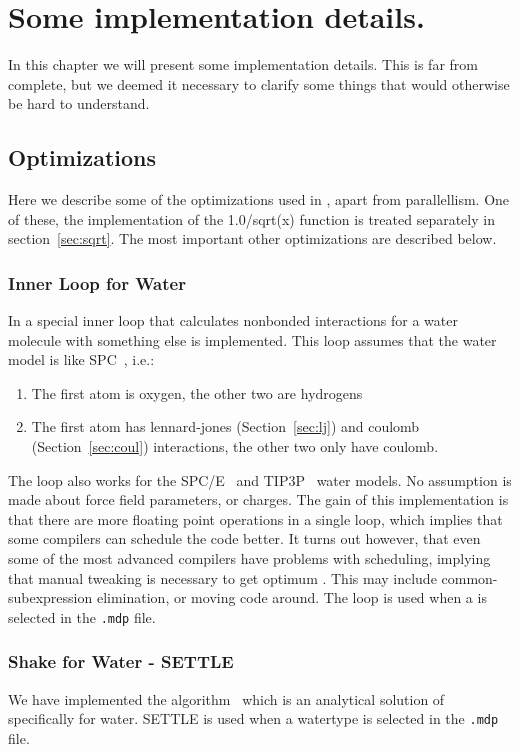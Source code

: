 \chapter{Some implementation details.}
In this chapter we will present some implementation details. This is
far from complete, but we deemed it necessary to clarify some things
that would otherwise be hard to understand.



\section{Optimizations}
Here we describe some of the optimizations used in {\gromacs}, apart
from parallellism. One of these, the implementation of the 
1.0/sqrt(x) function is treated separately in section~\ref{sec:sqrt}.
The most important other optimizations are described below.

\subsection{Inner Loop for Water}
In {\gromacs} a special inner loop that calculates nonbonded
interactions for a water molecule with something else is 
implemented. This loop assumes that the water model is like
SPC~\cite{Berendsen81}, i.e.:
\begin{enumerate}
\item	The first atom is oxygen, the other two are hydrogens
\item	The first atom has lennard-jones (Section~\ref{sec:lj}) and 
	coulomb (Section~\ref{sec:coul}) interactions, the other
	two only have coulomb.
\end{enumerate}

The loop also works for the SPC/E~\cite{Berendsen87} and 
TIP3P~\cite{Jorgensen83} water models. No assumption is made about
force field parameters, or charges.
The gain of this implementation is that there are more floating point
operations in a single loop, which implies that some compilers
can schedule the code better. It turns out however, that even
some of the most advanced compilers have problems with scheduling, 
implying that manual tweaking is necessary to get optimum 
.
This may include common-subexpression elimination, or moving
code around. 
The loop is used when a  is selected in the 
{\tt .mdp} file.

\subsection{Shake for Water - SETTLE}
\label{sec:settle}
We have implemented the  algorithm~\cite{Miyamoto92} which is
an analytical solution of  specifically for water. 
SETTLE is used when a watertype is selected in the {\tt .mdp} file.

